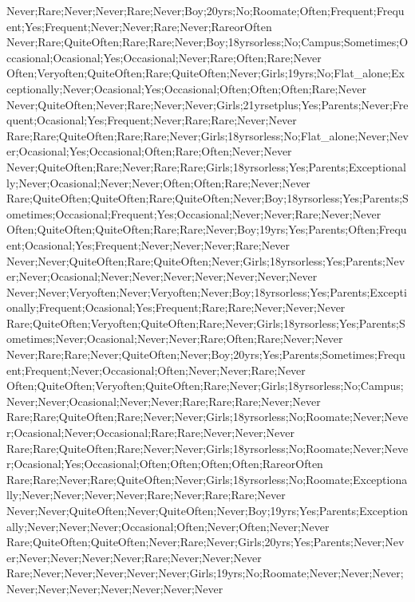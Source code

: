 Never;Rare;Never;Never;Rare;Never;Boy;20yrs;No;Roomate;Often;Frequent;Frequent;Yes;Frequent;Never;Never;Rare;Never;RareorOften
Never;Rare;QuiteOften;Rare;Rare;Never;Boy;18yrsorless;No;Campus;Sometimes;Occasional;Ocasional;Yes;Occasional;Never;Rare;Often;Rare;Never
Often;Veryoften;QuiteOften;Rare;QuiteOften;Never;Girls;19yrs;No;Flat_alone;Exceptionally;Never;Ocasional;Yes;Occasional;Often;Often;Often;Rare;Never
Never;QuiteOften;Never;Rare;Never;Never;Girls;21yrsetplus;Yes;Parents;Never;Frequent;Ocasional;Yes;Frequent;Never;Rare;Rare;Never;Never
Rare;Rare;QuiteOften;Rare;Rare;Never;Girls;18yrsorless;No;Flat_alone;Never;Never;Ocasional;Yes;Occasional;Often;Rare;Often;Never;Never
Never;QuiteOften;Rare;Never;Rare;Rare;Girls;18yrsorless;Yes;Parents;Exceptionally;Never;Ocasional;Never;Never;Often;Often;Rare;Never;Never
Rare;QuiteOften;QuiteOften;Rare;QuiteOften;Never;Boy;18yrsorless;Yes;Parents;Sometimes;Occasional;Frequent;Yes;Occasional;Never;Never;Rare;Never;Never
Often;QuiteOften;QuiteOften;Rare;Rare;Never;Boy;19yrs;Yes;Parents;Often;Frequent;Ocasional;Yes;Frequent;Never;Never;Never;Rare;Never
Never;Never;QuiteOften;Rare;QuiteOften;Never;Girls;18yrsorless;Yes;Parents;Never;Never;Ocasional;Never;Never;Never;Never;Never;Never;Never
Never;Never;Veryoften;Never;Veryoften;Never;Boy;18yrsorless;Yes;Parents;Exceptionally;Frequent;Ocasional;Yes;Frequent;Rare;Rare;Never;Never;Never
Rare;QuiteOften;Veryoften;QuiteOften;Rare;Never;Girls;18yrsorless;Yes;Parents;Sometimes;Never;Ocasional;Never;Never;Rare;Often;Rare;Never;Never
Never;Rare;Rare;Never;QuiteOften;Never;Boy;20yrs;Yes;Parents;Sometimes;Frequent;Frequent;Never;Occasional;Often;Never;Never;Rare;Never
Often;QuiteOften;Veryoften;QuiteOften;Rare;Never;Girls;18yrsorless;No;Campus;Never;Never;Ocasional;Never;Never;Rare;Rare;Rare;Never;Never
Rare;Rare;QuiteOften;Rare;Never;Never;Girls;18yrsorless;No;Roomate;Never;Never;Ocasional;Never;Occasional;Rare;Rare;Never;Never;Never
Rare;Rare;QuiteOften;Rare;Never;Never;Girls;18yrsorless;No;Roomate;Never;Never;Ocasional;Yes;Occasional;Often;Often;Often;Often;RareorOften
Rare;Rare;Never;Rare;QuiteOften;Never;Girls;18yrsorless;No;Roomate;Exceptionally;Never;Never;Never;Never;Rare;Never;Rare;Rare;Never
Never;Never;QuiteOften;Never;QuiteOften;Never;Boy;19yrs;Yes;Parents;Exceptionally;Never;Never;Never;Occasional;Often;Never;Often;Never;Never
Rare;QuiteOften;QuiteOften;Never;Rare;Never;Girls;20yrs;Yes;Parents;Never;Never;Never;Never;Never;Never;Rare;Never;Never;Never
Rare;Never;Never;Never;Never;Never;Girls;19yrs;No;Roomate;Never;Never;Never;Never;Never;Never;Never;Never;Never;Never
